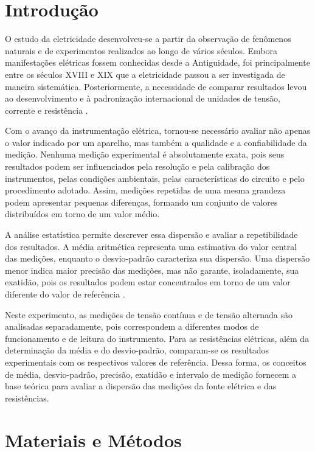 \documentclass[a4paper,12pt]{article}
\begin{document}
\section{Introdução}

O estudo da eletricidade desenvolveu-se a partir da observação de fenômenos
naturais e de experimentos realizados ao longo de vários séculos. Embora
manifestações elétricas fossem conhecidas desde a Antiguidade, foi principalmente
entre os séculos XVIII e XIX que a eletricidade passou a ser investigada de
maneira sistemática. Posteriormente, a necessidade de comparar resultados levou
ao desenvolvimento e à padronização internacional de unidades de tensão,
corrente e resistência \cite{nist_ampere}.

Com o avanço da instrumentação elétrica, tornou-se necessário avaliar não apenas
o valor indicado por um aparelho, mas também a qualidade e a confiabilidade da
medição. Nenhuma medição experimental é absolutamente exata, pois seus resultados
podem ser influenciados pela resolução e pela calibração dos instrumentos, pelas
condições ambientais, pelas características do circuito e pelo procedimento
adotado. Assim, medições repetidas de uma mesma grandeza podem apresentar pequenas
diferenças, formando um conjunto de valores distribuídos em torno de um valor
médio.

A análise estatística permite descrever essa dispersão e avaliar a repetibilidade
dos resultados. A média aritmética representa uma estimativa do valor central das
medições, enquanto o desvio-padrão caracteriza sua dispersão. Uma dispersão menor
indica maior precisão das medições, mas não garante, isoladamente, sua exatidão,
pois os resultados podem estar concentrados em torno de um valor diferente do
valor de referência \cite{jcgm_vim,jcgm_gum}.

Neste experimento, as medições de tensão contínua e de tensão alternada são
analisadas separadamente, pois correspondem a diferentes modos de funcionamento e
de leitura do instrumento. Para as resistências elétricas, além da determinação
da média e do desvio-padrão, comparam-se os resultados experimentais com os
respectivos valores de referência. Dessa forma, os conceitos de média,
desvio-padrão, precisão, exatidão e intervalo de medição fornecem a base teórica
para avaliar a dispersão das medições da fonte elétrica e das resistências.

\section{Materiais e Métodos}
\end{document}
